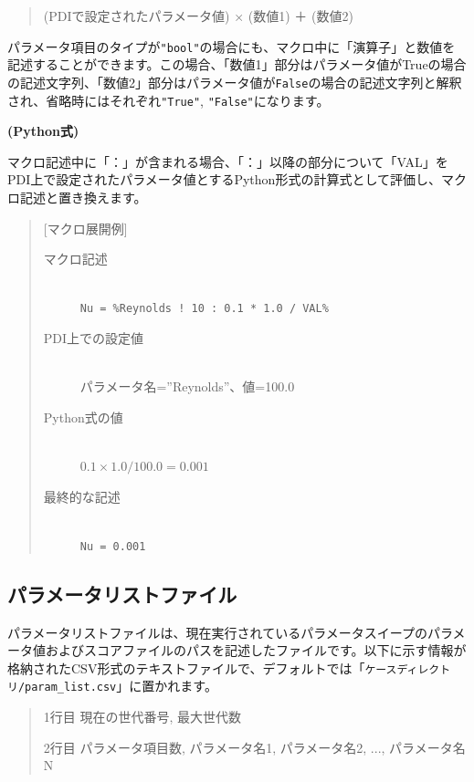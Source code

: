 \documentclass[a4paper,11pt]{jarticle}
\begin{document}
{\begin{quote}
(PDIで設定されたパラメータ値) × (数値1) ＋ (数値2)
\end{quote}

パラメータ項目のタイプが\texttt{"bool"}の場合にも、マクロ中に「演算子」と数値を記述することができます。この場合、「数値1」部分はパラメータ値がTrueの場合の記述文字列、「数値2」部分はパラメータ値が{\tt False}の場合の記述文字列と解釈され、省略時にはそれぞれ\texttt{"True"}, \texttt{"False"}になります。

\medskip
{\bf (Python式)}

マクロ記述中に「：」が含まれる場合、「：」以降の部分について「VAL」をPDI上で設定されたパラメータ値とするPython形式の計算式として評価し、マクロ記述と置き換えます。

\begin{quote}
[マクロ展開例]

\begin{description}
\item[マクロ記述] {\ }\\
{\tt Nu = \%Reynolds ! 10 : 0.1 * 1.0 / VAL\%}

\item[PDI上での設定値] {\ }\\
パラメータ名=''Reynolds''、値=100.0

\item[Python式の値]  {\ }\\
$0.1 \times 1.0 \slash 100.0 = 0.001$

\item[最終的な記述]  {\ }\\
{\tt Nu = 0.001}
\end{description}
\end{quote}


\newpage
\subsection{{\large{}パラメータリストファイル}}

パラメータリストファイルは、現在実行されているパラメータスイープのパラメータ値およびスコアファイルのパスを記述したファイルです。以下に示す情報が格納されたCSV形式のテキストファイルで、デフォルトでは「{\tt ケースディレクトリ/param\_list.csv}」に置かれます。
\begin{tt}
\begin{quote}
1行目 現在の世代番号,  最大世代数

2行目 パラメータ項目数,  パラメータ名1,  パラメータ名2, ...,  パラメータ名N


\end{quote}
\end{tt}}
\end{document}
